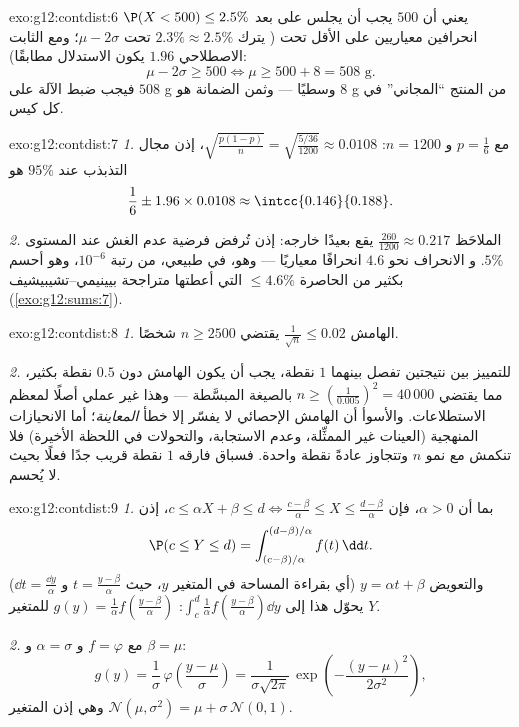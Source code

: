 \begin{solution}{exo:g12:contdist:6}
$\P(X < 500) \leq 2.5\%$ يعني أن $500$ يجب أن يجلس على بعد انحرافين
معياريين على الأقل تحت  ( يترك $2.3\% \approx 2.5\%$ تحت
$\mu - 2\sigma$؛ ومع الثابت الاصطلاحي $1.96$ يكون الاستدلال مطابقًا):
\[
\mu - 2\sigma \geq 500 \iff \mu \geq 500 + 8 = 508 \text{ g}.
\]
فيجب ضبط الآلة على $508$ g وسطيًا --- وثمن الضمانة
هو $8$ g من المنتج ``المجاني'' في كل كيس.
\end{solution}

\begin{solution}{exo:g12:contdist:7}
\emph{1.} مع $p = \frac16$ و $n = 1200$:
$\sqrt{\frac{p(1-p)}{n}} = \sqrt{\frac{5/36}{1200}} \approx 0.0108$، إذن
مجال التذبذب عند $95\%$ هو
\[
\frac16 \pm 1.96 \times 0.0108 \approx \intcc{0.146}{0.188}.
\]

\emph{2.}  الملاحَظ $\frac{260}{1200} \approx 0.217$ يقع بعيدًا
خارجه: إذن تُرفض فرضية عدم الغش عند المستوى $5\%$. و
الانحراف نحو $4.6$ انحرافًا معياريًا --- وهو، في 
طبيعي،  من رتبة $10^{-6}$، وهو أحسم بكثير من
الحاصرة $\leq 4.6\%$ التي أعطتها متراجحة بيينيمي--تشيبيشيف
(\cref{exo:g12:sums:7}).
\end{solution}

\begin{solution}{exo:g12:contdist:8}
\emph{1.} الهامش $\frac{1}{\sqrt n} \leq 0.02$ يقتضي
$n \geq 2500$ شخصًا.

\emph{2.} للتمييز بين نتيجتين تفصل بينهما $1$ نقطة، يجب أن يكون الهامش دون
$0.5$ نقطة بكثير، مما يقتضي $n \geq \left(\frac{1}{0.005}\right)^2 =
40\,000$ بالصيغة المبسَّطة --- وهذا غير عملي أصلًا لمعظم الاستطلاعات.
والأسوأ أن الهامش الإحصائي لا يفسّر إلا خطأ \emph{المعاينة}؛
أما الانحيازات المنهجية (العينات غير الممثِّلة، وعدم الاستجابة،
والتحولات في اللحظة الأخيرة) فلا تنكمش مع نمو $n$ وتتجاوز عادةً نقطة واحدة.
فسباق فارقه $1$ نقطة قريب جدًا فعلًا بحيث لا يُحسم.
\end{solution}

\begin{solution}{exo:g12:contdist:9}
\emph{1.} بما أن $\alpha > 0$، فإن $c \leq \alpha X + \beta \leq d
\iff \frac{c - \beta}{\alpha} \leq X \leq \frac{d - \beta}{\alpha}$، إذن
\[
\P(c \leq Y \leq d)
= \int_{(c-\beta)/\alpha}^{(d-\beta)/\alpha} f(t)\,\dd t .
\]
والتعويض $y = \alpha t + \beta$ (أي بقراءة المساحة في المتغير
$y$، حيث $t = \frac{y - \beta}{\alpha}$ و $\dd t = \frac{\dd y}{\alpha}$)
يحوّل هذا إلى
$\int_c^d \frac{1}{\alpha} f\left(\frac{y-\beta}{\alpha}\right)\dd y$: 
$g(y) = \frac1\alpha f\left(\frac{y-\beta}{\alpha}\right)$ 
للمتغير $Y$.

\emph{2.} مع $f = \varphi$ و $\alpha = \sigma$ و $\beta = \mu$:
\[
g(y) = \frac{1}{\sigma}\,\varphi\!\left(\frac{y - \mu}{\sigma}\right)
= \frac{1}{\sigma\sqrt{2\pi}}\,
\exp\left(-\frac{(y-\mu)^2}{2\sigma^2}\right),
\]
وهي إذن  المتغير
$\mathcal N(\mu, \sigma^2) = \mu + \sigma\,\mathcal N(0,1)$.
\end{solution}

